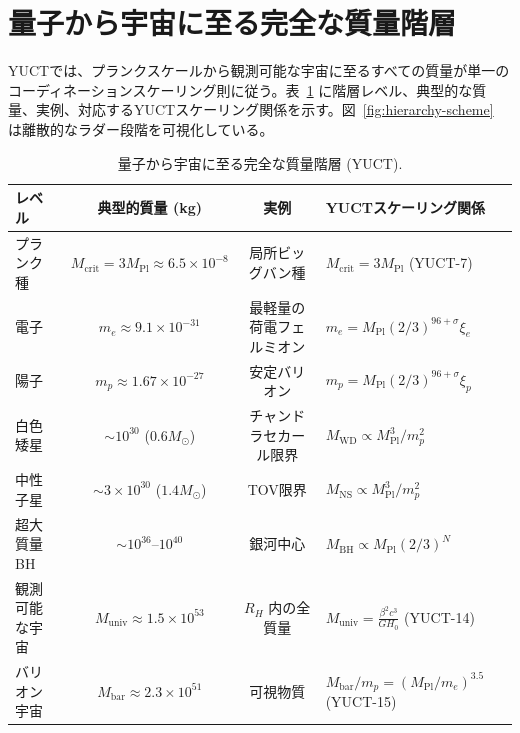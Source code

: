 \documentclass[12pt,a4paper]{article}
\newcommand{\betaf}{\beta}
\begin{document}
	\section{量子から宇宙に至る完全な質量階層}
	
	YUCTでは、プランクスケールから観測可能な宇宙に至るすべての質量が単一のコーディネーションスケーリング則に従う。表~\ref{tab:full-hierarchy} に階層レベル、典型的な質量、実例、対応するYUCTスケーリング関係を示す。図~\ref{fig:hierarchy-scheme} は離散的なラダー段階を可視化している。
	
	\begin{table}[htbp]
		\centering
		\caption{量子から宇宙に至る完全な質量階層 (YUCT).}
		\label{tab:full-hierarchy}
		\small
		\begin{tabular}{l c c l}
			\toprule
			\textbf{レベル} & \textbf{典型的質量 (kg)} & \textbf{実例} & \textbf{YUCTスケーリング関係} \\
			\midrule
			プランク種 & \(M_{\mathrm{crit}} = 3M_{\mathrm{Pl}} \approx 6.5\times10^{-8}\) & 局所ビッグバン種 & \(M_{\mathrm{crit}} = 3 M_{\mathrm{Pl}}\) (YUCT-7) \\
			電子 & \(m_e \approx 9.1\times10^{-31}\) & 最軽量の荷電フェルミオン & \(m_e = M_{\mathrm{Pl}} (2/3)^{96+\sigma}\xi_e\) \\
			陽子 & \(m_p \approx 1.67\times10^{-27}\) & 安定バリオン & \(m_p = M_{\mathrm{Pl}} (2/3)^{96+\sigma}\xi_p\) \\
			白色矮星 & \(\sim 10^{30}\) (\(0.6M_\odot\)) & チャンドラセカール限界 & \(M_{\mathrm{WD}} \propto M_{\mathrm{Pl}}^{3}/m_p^2\) \\
			中性子星 & \(\sim 3\times10^{30}\) (\(1.4M_\odot\)) & TOV限界 & \(M_{\mathrm{NS}} \propto M_{\mathrm{Pl}}^{3}/m_p^2\) \\
			超大質量BH & \(\sim 10^{36}\)–\(10^{40}\) & 銀河中心 & \(M_{\mathrm{BH}} \propto M_{\mathrm{Pl}} (2/3)^{N}\) \\
			観測可能な宇宙 & \(M_{\mathrm{univ}} \approx 1.5\times10^{53}\) & \(R_H\) 内の全質量 & \(M_{\mathrm{univ}} = \frac{\betaf^2 c^3}{G H_0}\) (YUCT-14) \\
			バリオン宇宙 & \(M_{\mathrm{bar}} \approx 2.3\times10^{51}\) & 可視物質 & \(M_{\mathrm{bar}}/m_p = (M_{\mathrm{Pl}}/m_e)^{3.5}\) (YUCT-15) \\
			\bottomrule
		\end{tabular}
	\end{table}
	
\end{document}

